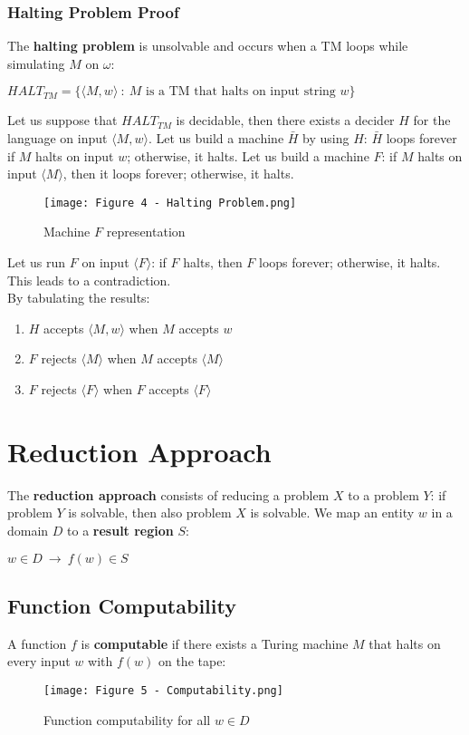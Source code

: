\documentclass{article}
\begin{document}
\subsubsection{Halting Problem Proof}
The \textbf{halting problem} is unsolvable and occurs when a TM loops while simulating $M$ on $\omega$:
\begin{center}
    $HALT_{TM} = \{\langle M,w\rangle \ : \ M\text{ is a TM that halts on input string } w\}$
\end{center}
Let us suppose that $HALT_{TM}$ is decidable, then there exists a decider $H$ for the language on input $\langle M,w\rangle$. Let us build a machine $\bar{H}$ by using $H$: $\bar{H}$ loops forever if $M$ halts on input $w$; otherwise, it halts. Let us build a machine $F$: if $M$ halts on input $\langle M \rangle$, then it loops forever; otherwise, it halts.
\begin{figure}[H]
    \centering
    \texttt{[image: Figure 4 - Halting Problem.png]}
    \caption{Machine $F$ representation}
\end{figure}
\noindent
Let us run $F$ on input $\langle F\rangle$: if $F$ halts, then $F$ loops forever; otherwise, it halts. This leads to a contradiction. \\
By tabulating the results:
\begin{enumerate}
    \item $H$ accepts $\langle M,w\rangle$ when $M$ accepts $w$
    \item $F$ rejects $\langle M\rangle$ when $M$ accepts $\langle M\rangle$
    \item $F$ rejects $\langle F\rangle$ when $F$ accepts $\langle F\rangle$
\end{enumerate}

\newpage

\section{Reduction Approach}
The \textbf{reduction approach} consists of reducing a problem $X$ to a problem $Y$: if problem $Y$ is solvable, then also problem $X$ is solvable. We map an entity $w$ in a domain $D$ to a \textbf{result region} $S$:
\begin{center}
    $w \in D \ \rightarrow \ f(w) \in S$
\end{center}
\subsection{Function Computability}
A function $f$ is \textbf{computable} if there exists a Turing machine $M$ that halts on every input $w$ with $f(w)$ on the tape:
\begin{figure}[H]
    \centering
    \texttt{[image: Figure 5 - Computability.png]}
    \caption{Function computability for all $w \in D$}
\end{figure}
\end{document}
